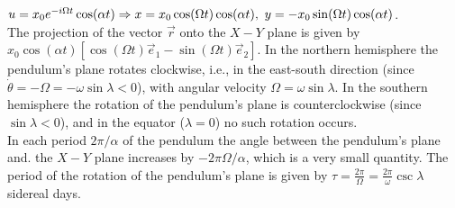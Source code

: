 $u=x_{0}e^{-i\Omega t}\cos(\alpha t)\Rightarrow x=x_{0}\cos(\Omega t)\cos(\alpha t),\ y=-x_{0}\sin(\Omega t)\cos(\alpha t)$.\\
The projection of the vector $\vec{r}$ onto the $X-Y$ plane is given by $x_{0}\cos(\alpha t)[\cos(\Omega t)\vec{e}_{1}-\sin(\Omega t)\vec{e}_{2}]$. In the northern hemisphere the pendulum's plane rotates clockwise, i.e., in the east-south direction (since $\dot{\theta}=-\Omega=-\omega\sin\lambda<0$), with angular velocity $\Omega =\omega\sin\lambda$. In the southern hemisphere the rotation of the pendulum's plane is counterclockwise (since $\sin\lambda<0$), and in the equator ($\lambda=0$) no such rotation occurs.\\
In each period $2\pi/\alpha$ of the pendulum the angle between the pendulum's plane and. the $X-Y$ plane increases by $-2\pi\Omega/\alpha$, which is a very small quantity. The period of the rotation of the pendulum's plane is given by $\tau=\frac{2\pi}{\Omega}=\frac{2\pi}{\omega}\csc\lambda$ sidereal days.






















